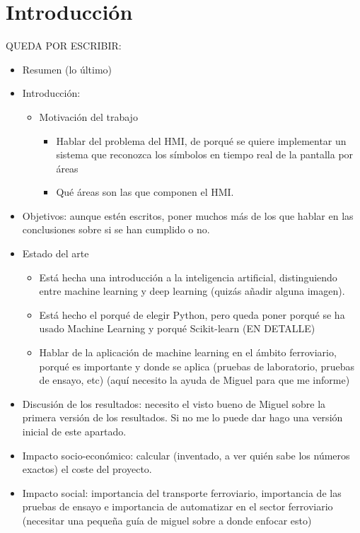 \chapter{Introducción}

QUEDA POR ESCRIBIR:
\begin{itemize}
	\item Resumen (lo último)
	\item Introducción: 
	\begin{itemize}
		\item Motivación del trabajo
		\begin{itemize}
			\item Hablar del problema del HMI, de porqué se quiere implementar un sistema que reconozca los símbolos en tiempo real de la pantalla por áreas
			\item Qué áreas son las que componen el HMI.
		\end{itemize}
	\end{itemize}
	\item Objetivos: aunque estén escritos, poner muchos más de los que hablar en las conclusiones sobre si se han cumplido o no.
	\item Estado del arte
	\begin{itemize}
		\item Está hecha una introducción a la inteligencia artificial, distinguiendo entre machine learning y deep learning (quizás añadir alguna imagen).
		\item Está hecho el porqué de elegir Python, pero queda poner porqué se ha usado Machine Learning y porqué Scikit-learn (EN DETALLE)
		\item Hablar de la aplicación de machine learning en el ámbito ferroviario, porqué es importante y donde se aplica (pruebas de laboratorio, pruebas de ensayo, etc) (aquí necesito la ayuda de Miguel para que me informe)
	\end{itemize}
	\item Discusión de los resultados: necesito el visto bueno de Miguel sobre la primera versión de los resultados. Si no me lo puede dar hago una versión inicial de este apartado.
	\item Impacto socio-económico: calcular (inventado, a ver quién sabe los números exactos) el coste del proyecto.
	\item Impacto social: importancia del transporte ferroviario, importancia de las pruebas de ensayo e importancia de automatizar en el sector ferroviario (necesitar una pequeña guía de miguel sobre a donde enfocar esto)

\end{itemize}
